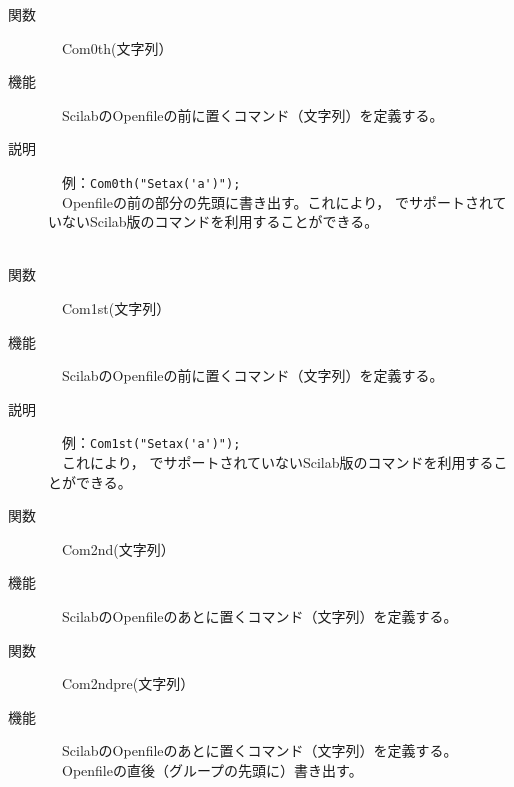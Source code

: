 \documentclass[papersize,a4paper,12pt,uplatex]{jsarticle}
\begin{document}
\begin{description}
\hypertarget{com0th}{}
\item[関数]　Com0th(文字列）
\item[機能]　ScilabのOpenfileの前に置くコマンド（文字列）を定義する。
\item[説明]　例：\verb|Com0th("Setax('a')");|\\
　Openfileの前の部分の先頭に書き出す。これにより， \ketcindy でサポートされていないScilab版\ketpic のコマンドを利用することができる。\\
　\\
\hypertarget{com1st}{}
\item[関数]　Com1st(文字列）
\item[機能]　ScilabのOpenfileの前に置くコマンド（文字列）を定義する。
\item[説明]　例：\verb|Com1st("Setax('a')");|\\
　これにより， \ketcindy でサポートされていないScilab版\ketpic のコマンドを利用することができる。
\\
\hypertarget{com2nd}{}
\item[関数]　Com2nd(文字列）
\item[機能]　ScilabのOpenfileのあとに置くコマンド（文字列）を定義する。
\\

\hypertarget{com2ndpre}{}
\item[関数]　Com2ndpre(文字列）
\item[機能]　ScilabのOpenfileのあとに置くコマンド（文字列）を定義する。
　Openfileの直後（グループの先頭に）書き出す。\\


\end{description}
\end{document}
